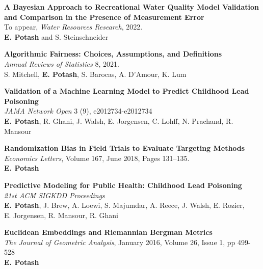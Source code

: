 \documentclass[margin,line]{resume}
\begin{document}
\begin{resume}
        {\bf A Bayesian Approach to Recreational Water Quality Model Validation\\and Comparison in the Presence of Measurement Error}\\
        To appear, \textit{Water Resources Research}, 2022.\\
        \textbf{E. Potash} and S. Steinschneider

        {\bf Algorithmic Fairness: Choices, Assumptions, and Definitions}\\
        \textit{Annual Reviews of Statistics} 8, 2021.\\
        S. Mitchell, \textbf{E. Potash}, S. Barocas, A. D'Amour, K. Lum

        {\bf Validation of a Machine Learning Model to Predict Childhood Lead \\ Poisoning}\\
        \textit{JAMA Network Open} 3 (9), e2012734-e2012734\\
        \textbf{E. Potash}, R. Ghani, J. Walsh, E. Jorgensen, C. Lohff, N. Prachand, R. Mansour

        {\bf Randomization Bias in Field Trials to Evaluate Targeting Methods}\\
        \textit{Economics Letters}, Volume 167, June 2018, Pages 131--135.\\
        \textbf{E. Potash}

	{\bf Predictive Modeling for Public Health: Childhood Lead Poisoning} \\
        \textit{21st ACM SIGKDD Proceedings} \\
        \textbf{E. Potash}, J. Brew, A. Loewi, S. Majumdar, A. Reece, J. Walsh, E. Rozier,\\ E. Jorgensen, R. Mansour, R. Ghani

	{\bf Euclidean Embeddings and Riemannian Bergman Metrics} \\
        \textit{The Journal of Geometric Analysis}, January 2016, Volume 26, Issue 1, pp 499-528\\
        \textbf{E. Potash}

        

\end{resume}
\end{document}
